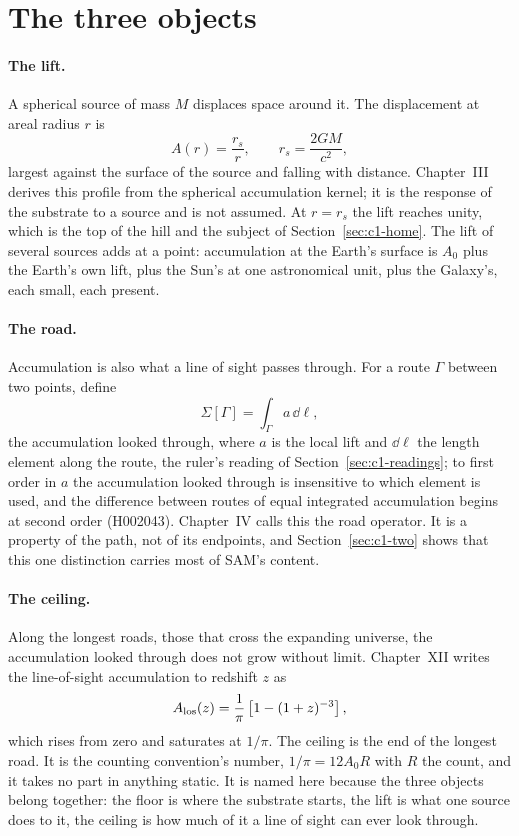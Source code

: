 \section{The three objects}
\label{sec:c1-three}

\paragraph{The lift.} A spherical source of mass $M$ displaces space around it. The displacement at areal radius $r$ is
\begin{equation}
A(r)=\frac{r_s}{r},\qquad r_s=\frac{2GM}{c^2},
\label{eq:c1-lift}
\end{equation}
largest against the surface of the source and falling with distance. Chapter~III derives this profile from the spherical accumulation kernel; it is the response of the substrate to a source and is not assumed. At $r=r_s$ the lift reaches unity, which is the top of the hill and the subject of Section~\ref{sec:c1-home}. The lift of several sources adds at a point: accumulation at the Earth's surface is $A_0$ plus the Earth's own lift, plus the Sun's at one astronomical unit, plus the Galaxy's, each small, each present.

\paragraph{The road.} Accumulation is also what a line of sight passes through. For a route $\Gamma$ between two points, define
\begin{equation}
\Sigma[\Gamma]=\int_\Gamma a\,\dd\ell,
\label{eq:c1-road}
\end{equation}
the accumulation looked through, where $a$ is the local lift and $\dd\ell$ the length element along the route, the ruler's reading of Section~\ref{sec:c1-readings}; to first order in $a$ the accumulation looked through is insensitive to which element is used, and the difference between routes of equal integrated accumulation begins at second order (H002043). Chapter~IV calls this the road operator. It is a property of the path, not of its endpoints, and Section~\ref{sec:c1-two} shows that this one distinction carries most of SAM's content.

\paragraph{The ceiling.} Along the longest roads, those that cross the expanding universe, the accumulation looked through does not grow without limit. Chapter~XII writes the line-of-sight accumulation to redshift $z$ as
\begin{equation}
A_{\rm los}(z)=\frac{1}{\pi}\left[1-(1+z)^{-3}\right],
\label{eq:c1-ceiling}
\end{equation}
which rises from zero and saturates at $1/\pi$. The ceiling is the end of the longest road. It is the counting convention's number, $1/\pi=12A_0 R$ with $R$ the count, and it takes no part in anything static. It is named here because the three objects belong together: the floor is where the substrate starts, the lift is what one source does to it, the ceiling is how much of it a line of sight can ever look through.

